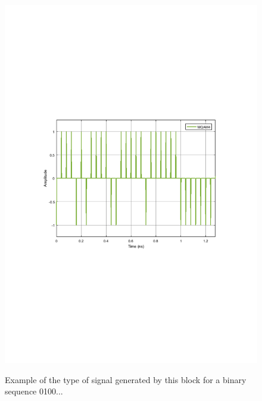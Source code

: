 \begin{figure}[h]
	\centering
	\includegraphics[clip, trim=0.5cm 9cm 0.5cm 9cm, width=\textwidth]{./lib/discrete_to_continuous_time/figures/MQAM_discrete_to_continuous_time_output.pdf}
	\label{MQAM4_DeterministicAppendZeros}\caption{Example of the type of signal generated by this block for a binary sequence 0100...}
\end{figure}


\pagebreak
